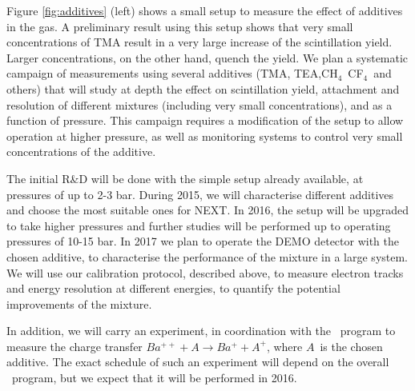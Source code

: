 Figure \ref{fig:additives} (left) shows a small setup to measure the effect of additives in the gas. A preliminary result using this setup shows that very small concentrations of TMA result in a very large increase of the scintillation yield. Larger concentrations, on the other hand, quench the yield. We plan a systematic campaign of measurements using several additives (TMA, TEA,CH$_4$~CF$_4$~and others) that will study at depth the effect on scintillation yield, attachment and resolution of different mixtures (including very small concentrations), and as a function of pressure. This campaign requires a modification of the setup to allow operation at higher pressure, as well as monitoring systems to control very small concentrations of the additive. 

The initial R\&D will be done with the simple setup already available, at pressures of up to 2-3 bar. During 2015, we will characterise different additives and choose the most suitable ones for NEXT. In 2016, the setup will be upgraded to take higher pressures and further studies will be performed up to operating pressures of 10-15 bar. In 2017 we plan to operate the DEMO detector with the chosen additive, to characterise the performance of the mixture in a large system. We will use our calibration protocol, described above, to measure electron tracks and energy resolution at different energies, to quantify the potential improvements of the mixture. 

In addition, we will carry an experiment, in coordination with the \BATA\ program  to measure the charge transfer $Ba^{++} + A \rightarrow Ba^{+} + A^{+}$, where $A$~is the chosen additive. The exact schedule of such an experiment will depend on the overall \BATA\ program, but we expect that it will be performed in 2016.
